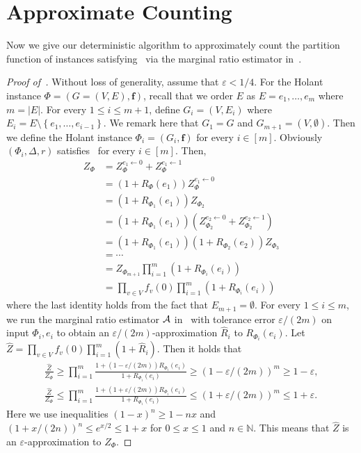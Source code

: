 \documentclass[11pt]{article}
\newcommand{\abs}[1]{\left\vert#1\right\vert}
\newcommand{\set}[1]{\left\{#1\right\}}
\newcommand{\wh}[1]{\widehat{#1}}
\newcommand{\vecf}{\boldsymbol{f}}
\begin{document}
\section{Approximate Counting}

Now we give our deterministic algorithm to approximately count the partition function of instances satisfying~ via the marginal ratio estimator in~.

\begin{proof}[Proof of~]
    Without loss of generality, assume that $\varepsilon < 1/4$. For the Holant instance $\Phi = (G = (V, E), \vecf)$, recall that we order $E$ as $E = e_1, \ldots, e_m$ where $m = \abs{E}$. For every $1 \le i \le m + 1$, define $G_i = (V, E_i)$ where $E_i = E \setminus \set{e_1, \ldots, e_{i - 1}}$. We remark here that $G_1 = G$ and $G_{m + 1} = (V, \emptyset)$. Then we define the Holant instance $\Phi_i = (G_i, \vecf)$ for every $i \in [m]$. Obviously $(\Phi_i, \Delta, r)$ satisfies~ for every $i \in [m]$. Then,
    \begin{align*}
        Z_{\Phi} &= Z_{\Phi}^{e_1 \gets 0} + Z_{\Phi}^{e_1 \gets 1} \\
        &= \left(1 + R_{\Phi}(e_1)\right) Z_{\Phi}^{e_1 \gets 0} \\
        &= \left(1 + R_{\Phi_1}(e_1)\right) Z_{\Phi_2} \\
        &= \left(1 + R_{\Phi_1}(e_1)\right) \left(Z_{\Phi_2}^{e_2 \gets 0} + Z_{\Phi_2}^{e_2 \gets 1}\right) \\
        &= \left(1 + R_{\Phi_1}(e_1)\right) \left(1 + R_{\Phi_2}(e_2)\right) Z_{\Phi_3} \\
        &= \cdots \\
        &= Z_{\Phi_{m + 1}}\prod_{i = 1}^{m} \left(1 + R_{\Phi_i}(e_i)\right) \\
        &= \prod_{v \in V} f_v(0) \prod_{i = 1}^{m} \left(1 + R_{\Phi_i}(e_i)\right)
    \end{align*}
    where the last identity holds from the fact that $E_{m + 1} = \emptyset$. For every $1 \le i \le m$, we run the marginal ratio estimator $\mathcal{A}$ in~ with tolerance error $\varepsilon/(2m)$ on input $\Phi_i, e_i$ to obtain an $\varepsilon/(2m)$-approximation $\wh{R}_i$ to $R_{\Phi_i}(e_i)$. Let $\wh{Z} = \prod_{v \in V} f_v(0) \prod_{i = 1}^{m} (1 + \wh{R}_i)$. Then it holds that
    \begin{gather*}
        \frac{\wh{Z}}{Z_\Phi} \ge \prod_{i = 1}^{m} \frac{1 + (1 - \varepsilon/(2m)) R_{\Phi_i}(e_i)}{1 + R_{\Phi_i}(e_i)} \ge (1 - \varepsilon/(2m))^m \ge 1 - \varepsilon, \\
        \frac{\wh{Z}}{Z_\Phi} \le \prod_{i = 1}^{m} \frac{1 + (1 + \varepsilon/(2m)) R_{\Phi_i}(e_i)}{1 + R_{\Phi_i}(e_i)} \le (1 + \varepsilon/(2m))^m \le 1 + \varepsilon.
    \end{gather*}
    Here we use inequalities $(1 - x)^{n} \ge 1 - nx$ and $(1 + x/(2n))^n \le e^{x/2} \le 1 + x$ for $0 \le x \le 1$ and $n \in \mathbb{N}$. This means that $\wh{Z}$ is an $\varepsilon$-approximation to $Z_{\Phi}$.


\end{proof}
\end{document}
